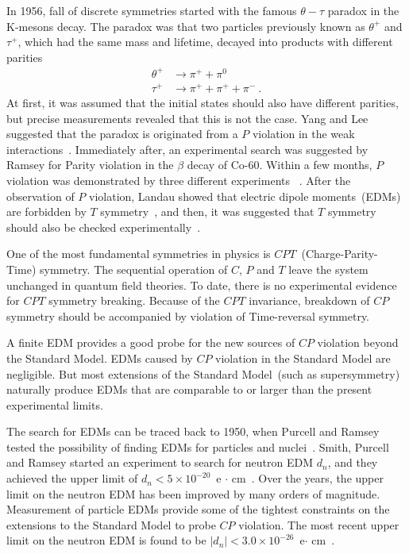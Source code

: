 In 1956, fall of discrete symmetries started with the famous
$\theta-\tau$ paradox in the K-mesons decay. The paradox was that two
particles previously known as $\theta^+$ and $\tau^+$, which had the
same mass and lifetime, decayed into products with different parities
\begin{equation}
  \begin{split}
    \theta^+ &\rightarrow \pi^+ + \pi^0 \\
    \tau^+ &\rightarrow \pi^+ + \pi^+ + \pi^-~.
  \end{split}
\end{equation}
At first, it was assumed that the initial states should also have
different parities, but precise measurements revealed that this is not
the case. Yang and Lee suggested that the paradox is originated from a
$P$ violation in the weak
interactions~\cite{lee1957parity}. Immediately after, an experimental
search was suggested by Ramsey for Parity violation in the $\beta$
decay of Co-60. Within a few months, $P$ violation was demonstrated by
three different experiments
~\cite{PhysRev.105.1413,PhysRev.105.1415,friedman1957nuclear}. After
the observation of $P$ violation, Landau showed that electric dipole
moments~(EDMs) are forbidden by $T$
symmetry~\cite{landau1957conservation}, and then, it was suggested
that $T$ symmetry should also be checked
experimentally~\cite{PhysRev.106.517}.

One of the most fundamental symmetries in physics is
$CPT$~(Charge-Parity-Time) symmetry. The sequential operation of $C$,
$P$ and $T$ leave the system unchanged in quantum field theories. To
date, there is no experimental evidence for $CPT$ symmetry
breaking. Because of the $CPT$ invariance, breakdown of $CP$ symmetry
should be accompanied by violation of Time-reversal symmetry.

A finite EDM provides a good probe for the new sources of $CP$
violation beyond the Standard Model. EDMs caused by $CP$ violation in
the Standard Model are negligible. But most extensions of the Standard
Model~(such as supersymmetry) naturally produce EDMs that are
comparable to or larger than the present experimental limits.

The search for EDMs can be traced back to 1950, when Purcell and
Ramsey tested the possibility of finding EDMs for particles and
nuclei~\cite{PhysRev.78.807}. Smith, Purcell and Ramsey started an
experiment to search for neutron EDM $d_n$, and they achieved the
upper limit of $d_n < 5 \times 10^{-20}$~e $\cdot$
cm~\cite{smith1957experimental}.  Over the years, the upper limit on
the neutron EDM has been improved by many orders of
magnitude. Measurement of particle EDMs provide some of the tightest
constraints on the extensions to the Standard Model to probe $CP$
violation. The most recent upper limit on the neutron EDM is found to
be $\vert d_n\vert < 3.0 \times 10^{-26} $~e$\cdot$
cm~\cite{Baker2006, pendlebury2015revised}.



